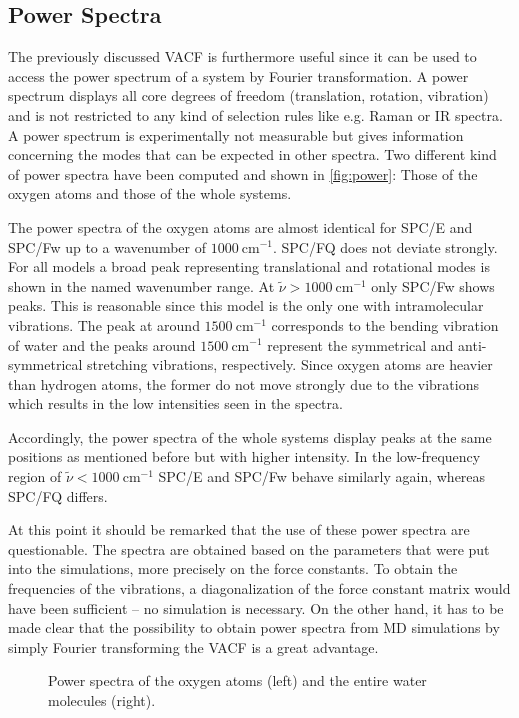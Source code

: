 \documentclass[a4paper,12pt]{scrartcl}
\begin{document}
	\subsection{Power Spectra}
		The previously discussed VACF is furthermore useful since it can be used to access the power spectrum of a system by Fourier transformation. A power spectrum displays all core degrees of freedom (translation, rotation, vibration) and is not restricted to any kind of selection rules like e.g. Raman or IR spectra. A power spectrum is experimentally not measurable but gives information concerning the modes that can be expected in other spectra. Two different kind of power spectra have been computed and shown in \autoref{fig:power}: Those of the oxygen atoms and those of the whole systems.
		
		The power spectra of the oxygen atoms are almost identical for SPC/E and SPC/Fw up to a wavenumber of $ \SI{1000}{\centi\meter^{-1}} $. SPC/FQ does not deviate strongly. For all models a broad peak representing translational and rotational modes is shown in the named wavenumber range. At $ \tilde{\nu} >  \SI{1000}{\centi\meter^{-1}} $ only SPC/Fw shows peaks. This is reasonable since this model is the only one with intramolecular vibrations. The peak at around $ \SI{1500}{\centi\meter^{-1}} $ corresponds to the bending vibration of water and the peaks around $ \SI{1500}{\centi\meter^{-1}} $ represent the symmetrical and anti-symmetrical stretching vibrations, respectively. Since oxygen atoms are heavier than hydrogen atoms, the former do not move strongly due to the vibrations which results in the low intensities seen in the spectra.
		
		Accordingly, the power spectra of the whole systems display peaks at the same positions as mentioned before but with higher intensity. In the low-frequency region of $ \tilde{\nu} <  \SI{1000}{\centi\meter^{-1}} $ SPC/E and SPC/Fw behave similarly again, whereas SPC/FQ differs.
		
		At this point it should be remarked that the use of these power spectra are questionable. The spectra are obtained based on the parameters that were put into the simulations, more precisely on the force constants. To obtain the frequencies of the vibrations, a diagonalization of the force constant matrix would have been sufficient -- no simulation is necessary. On the other hand, it has to be made clear that the possibility to obtain power spectra from MD simulations by simply Fourier transforming the VACF is a great advantage.
		\begin{figure}
			\centering
			
			\vspace{-20pt}
			\caption{Power spectra of the oxygen atoms (left) and the entire water molecules (right).}
			\label{fig:power}
		\end{figure}
\end{document}
